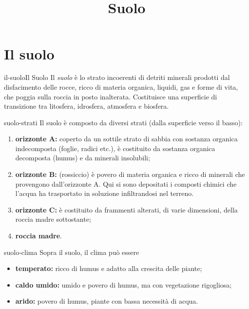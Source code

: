 \documentclass[preview]{standalone}
\begin{document}
\title{Suolo}
\genpage

\section{Il suolo}

\begin{snippetdefinition}{il-suolo}{Il Suolo}
    Il \textit{suolo} è lo strato incoerenti di detriti minerali prodotti dal disfacimento delle rocce,
    ricco di materia organica, liquidi, gas e forme di vita, che poggia sulla roccia
    in posto inalterata. Costituisce una superficie di transizione tra litosfera,
    idrosfera, atmosfera e biosfera.
\end{snippetdefinition}

\begin{snippet}{suolo-strati}
    Il suolo è composto da diversi strati (dalla superficie verso il basso):
    \begin{enumerate}
        \item \textbf{orizzonte A:} coperto da un sottile
            strato di sabbia con sostanza organica indecomposta (foglie, radici etc.),
            è costituito da sostanza organica decomposta (humus) e da minerali insolubili;
        \item \textbf{orizzonte B:} (rossiccio) è povero di materia organica e ricco di minerali che provengono
            dall'orizzonte A. Qui si sono depositati i composti chimici che l'acqua ha trasportato in soluzione infiltrandosi nel terreno.
        \item \textbf{orizzonte C:} è costituito da frammenti alterati, di varie dimensioni, della roccia madre sottostante;
        \item \textbf{roccia madre}.
    \end{enumerate}
\end{snippet}

\begin{snippet}{suolo-clima}
    Sopra il suolo, il clima può essere
    \begin{itemize}
        \item \textbf{temperato:} ricco di humus e adatto alla crescita delle piante;
        \item \textbf{caldo umido:} umido e povero di humus, ma con vegetazione rigogliosa;
        \item \textbf{arido:} povero di humus, piante con bassa necessità di acqua.
    \end{itemize}
\end{snippet}
\end{document}

